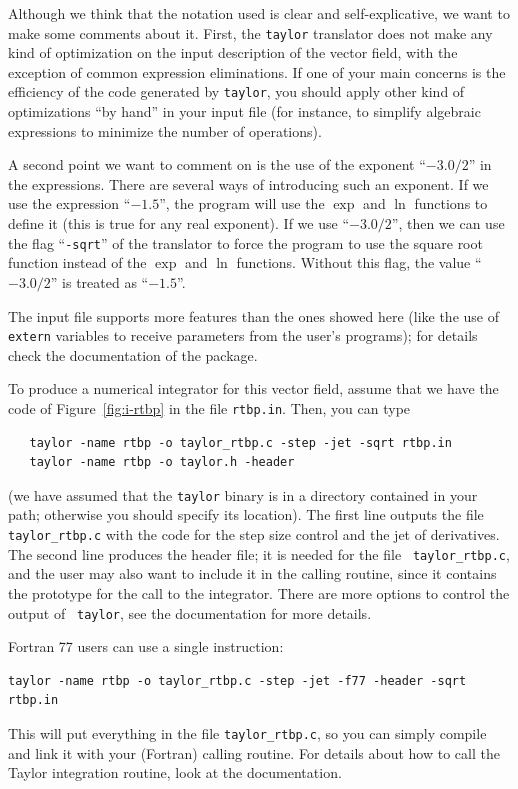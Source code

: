 \documentclass[12pt,twoside]{article}
\begin{document}
Although we think that the notation used is clear and
self-explicative, we want to make some comments about it. First, the
{\tt taylor} translator does not make any kind of optimization on the
input description of the vector field, with the exception of common
expression eliminations.  If one of your main concerns is the
efficiency of the code generated by {\tt taylor}, you should apply
other kind of optimizations ``by hand'' in your input file (for
instance, to simplify algebraic expressions to minimize the number of
operations).

A second point we want to comment on is the use of the exponent
``$-3.0/2$'' in the expressions. There are several ways of introducing
such an exponent. If we use the expression ``$-1.5$'', the program
will use the $\exp$ and $\ln$ functions to define it (this is true for
any real exponent). If we use ``$-3.0/2$'', then we can use the flag
``\verb+-sqrt+'' of the translator to force the program to use the
square root function instead of the $\exp$ and $\ln$ functions.
Without this flag, the value ``$-3.0/2$'' is treated as ``$-1.5$''.

The input file supports more features than the ones showed here (like
the use of {\tt extern} variables to receive parameters from the
user's programs); for details check the documentation of the package.

To produce a numerical integrator for this vector field, assume that
we have the code of Figure~\ref{fig:i-rtbp} in the file {\tt rtbp.in}.
Then, you can type
\begin{verbatim}
   taylor -name rtbp -o taylor_rtbp.c -step -jet -sqrt rtbp.in
   taylor -name rtbp -o taylor.h -header
\end{verbatim}
(we have assumed that the {\tt taylor} binary is in a directory
contained in your path; otherwise you should specify its location).
The first line outputs the file {\tt taylor\_rtbp.c} with the code for
the step size control and the jet of derivatives. The second line
produces the header file; it is needed for the file {\tt
taylor\_rtbp.c}, and the user may also want to include it in the
calling routine, since it contains the prototype for the call to the
integrator. There are more options to control the output of {\tt
taylor}, see the documentation for more details.

Fortran 77 users can use a single instruction:
\begin{verbatim}
taylor -name rtbp -o taylor_rtbp.c -step -jet -f77 -header -sqrt rtbp.in
\end{verbatim}
This will put everything in the file {\tt taylor\_rtbp.c}, so you can
simply compile and link it with your (Fortran) calling routine. For
details about how to call the Taylor integration routine, look at the
documentation.
\end{document}
